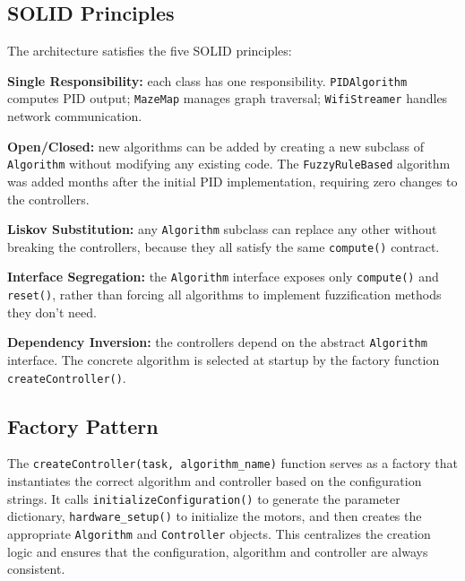 \subsection{SOLID Principles}
\label{sec:solid}

The architecture satisfies the five SOLID principles:

\textbf{Single Responsibility:} each class has one responsibility. \texttt{PIDAlgorithm} computes PID output; \texttt{MazeMap} manages graph traversal; \texttt{WifiStreamer} handles network communication.

\textbf{Open/Closed:} new algorithms can be added by creating a new subclass of \texttt{Algorithm} without modifying any existing code. The \texttt{FuzzyRuleBased} algorithm was added months after the initial PID implementation, requiring zero changes to the controllers.

\textbf{Liskov Substitution:} any \texttt{Algorithm} subclass can replace any other without breaking the controllers, because they all satisfy the same \texttt{compute()} contract.

\textbf{Interface Segregation:} the \texttt{Algorithm} interface exposes only \texttt{compute()} and \texttt{reset()}, rather than forcing all algorithms to implement fuzzification methods they don't need.

\textbf{Dependency Inversion:} the controllers depend on the abstract \texttt{Algorithm} interface. The concrete algorithm is selected at startup by the factory function \texttt{createController()}.

\subsection{Factory Pattern}
\label{sec:factory}

The \texttt{createController(task, algorithm\_name)} function serves as a factory that instantiates the correct algorithm and controller based on the configuration strings. It calls \texttt{initializeConfiguration()} to generate the parameter dictionary, \texttt{hardware\_setup()} to initialize the motors, and then creates the appropriate \texttt{Algorithm} and \texttt{Controller} objects. This centralizes the creation logic and ensures that the configuration, algorithm and controller are always consistent.


